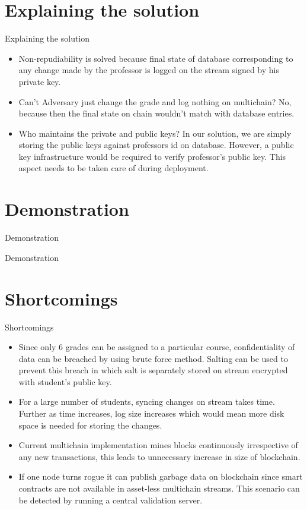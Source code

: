 \documentclass{beamer}
\begin{document}
\section{Explaining the solution}
\begin{frame}{Explaining the solution}
    \begin{itemize}
        \item Non-repudiability is solved because final state of database corresponding to any change made by the professor is logged on the stream signed by his private key.
        \item Can't Adversary just change the grade and log nothing on multichain? No, because then the final state on chain wouldn't match with database entries.
        \item Who maintains the private and public keys? In our solution, we are simply storing the public keys against professors id on database. However, a public key infrastructure would be required to verify professor's public key. This aspect needs to be taken care of during deployment.
    \end{itemize}
\end{frame}
\section{Demonstration}
\begin{frame}{Demonstration}
\begin{center}
\Huge Demonstration
\end{center}

\end{frame}
\section{Shortcomings}
\begin{frame}{Shortcomings}
\begin{itemize}
\item Since only 6 grades can be assigned to a particular course, confidentiality of data can be breached by using brute force method. Salting can be used to prevent this breach in which salt is separately stored on stream encrypted with student's public key.
\item For a large number of students, syncing changes on stream takes time. Further as time increases, log size increases which would mean more disk space is needed for storing the changes.
\item Current multichain implementation mines blocks continuously irrespective of any new transactions, this leads to unnecessary increase in size of blockchain.
\item If one node turns rogue it can publish garbage data on blockchain since smart contracts are not available in asset-less multichain streams. This scenario can be detected by running a central validation server.  
\end{itemize}
\end{frame}
\end{document}
